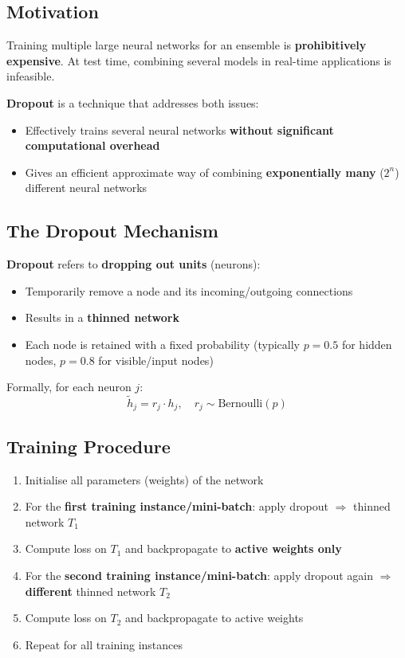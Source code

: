 \documentclass[12pt,a4paper]{article}
\begin{document}
\subsection{Motivation}

Training multiple large neural networks for an ensemble is \textbf{prohibitively expensive}. At test time, combining several models in real-time applications is infeasible.

\textbf{Dropout} is a technique that addresses both issues:
\begin{itemize}
  \item Effectively trains several neural networks \textbf{without significant computational overhead}
  \item Gives an efficient approximate way of combining \textbf{exponentially many} ($2^n$) different neural networks
\end{itemize}

\subsection{The Dropout Mechanism}

\textbf{Dropout} refers to \textbf{dropping out units} (neurons):
\begin{itemize}
  \item Temporarily remove a node and its incoming/outgoing connections
  \item Results in a \textbf{thinned network}
  \item Each node is retained with a fixed probability (typically $p = 0.5$ for hidden nodes, $p = 0.8$ for visible/input nodes)
\end{itemize}

Formally, for each neuron $j$:
\[
  \tilde{h}_j = r_j \cdot h_j,\quad r_j \sim \text{Bernoulli}(p)
\]

\subsection{Training Procedure}

\begin{enumerate}
  \item Initialise all parameters (weights) of the network
  \item For the \textbf{first training instance/mini-batch}: apply dropout $\Rightarrow$ thinned network $T_1$
  \item Compute loss on $T_1$ and backpropagate to \textbf{active weights only}
  \item For the \textbf{second training instance/mini-batch}: apply dropout again $\Rightarrow$ \textbf{different} thinned network $T_2$
  \item Compute loss on $T_2$ and backpropagate to active weights
  \item Repeat for all training instances
\end{enumerate}
\end{document}
